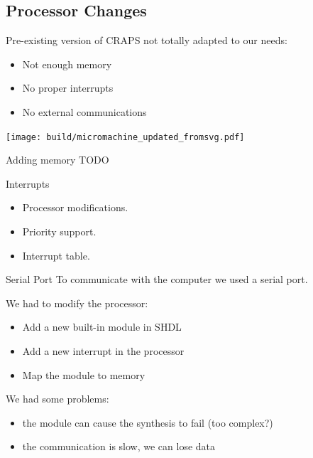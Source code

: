\documentclass{beamer}
\begin{document}
    \subsection{Processor Changes}
    \begin{frame}
        Pre-existing version of CRAPS not totally adapted to our needs:
        \begin{itemize}
          \item Not enough memory
          \item No proper interrupts
          \item No external communications
        \end{itemize}
    \end{frame}
    \begin{landscape}
        \begin{frame}[plain]
            \texttt{[image: build/micromachine\_updated\_fromsvg.pdf]}

        \end{frame}
    \end{landscape}

    \begin{frame}{Adding memory}
        TODO
    \end{frame}

    \begin{frame}{Interrupts}
      \begin{itemize}
        \item Processor modifications.
        \item Priority support.
        \item Interrupt table.
      \end{itemize}
    \end{frame}

    \begin{frame}{Serial Port}
      To communicate with the computer we used a serial port.

      \pause
      We had to modify the processor:
      \begin{itemize}
        \item Add a new built-in module in SHDL
        \item Add a new interrupt in the processor
        \item Map the module to memory
      \end{itemize}

      \pause
      We had some problems:
      \begin{itemize}
        \item the module can cause the synthesis to fail (too complex?)
        \item the communication is slow, we can lose data
      \end{itemize}
    \end{frame}
\end{document}
